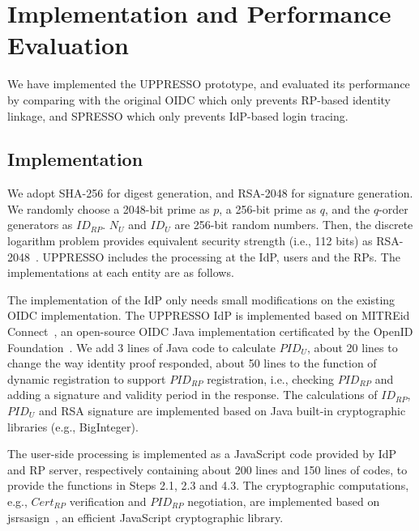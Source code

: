 \section{Implementation and Performance Evaluation}
\label{sec:implementation}
We have implemented the UPPRESSO prototype,
and evaluated its performance by comparing with the original OIDC which only prevents RP-based identity linkage,
 and SPRESSO which only prevents IdP-based login tracing.

\subsection{Implementation}
We adopt SHA-256 for digest generation, and  RSA-2048 for signature generation. %
We randomly choose a 2048-bit prime as $p$, a 256-bit prime as $q$, and the  $q$-order generators as $ID_{RP}$.
$N_U$ and $ID_U$  are 256-bit random numbers.
Then, the discrete logarithm problem provides equivalent security strength (i.e., 112 bits) as RSA-2048~\cite{barkerecommendation}.
UPPRESSO includes the processing at the IdP, users and the RPs.
The implementations at each entity are as follows.

The implementation of the IdP only needs small modifications on the existing OIDC implementation.
The UPPRESSO IdP is implemented based on MITREid Connect~\cite{MITREid}, an open-source OIDC Java implementation certificated by the OpenID Foundation~\cite{OIDF}.
We add 3 lines of Java code to calculate $PID_U$, about 20 lines to change the way identity proof responded,
about 50 lines to the function of dynamic registration to support $PID_{RP}$ registration,
 i.e., checking $PID_{RP}$ and adding a signature and validity period in the response.  %
The calculations of $ID_{RP}$, $PID_U$ and RSA signature are implemented based on Java built-in cryptographic libraries (e.g., BigInteger).

The user-side processing is implemented as a JavaScript code provided by IdP and RP server, respectively containing about 200 lines and 150 lines of codes,
to provide the functions in Steps 2.1, 2.3 and 4.3.
The cryptographic computations, e.g., $Cert_{RP}$ verification and $PID_{RP}$ negotiation, are implemented based on jsrsasign~\cite{jsrsasign}, an efficient JavaScript cryptographic library.

